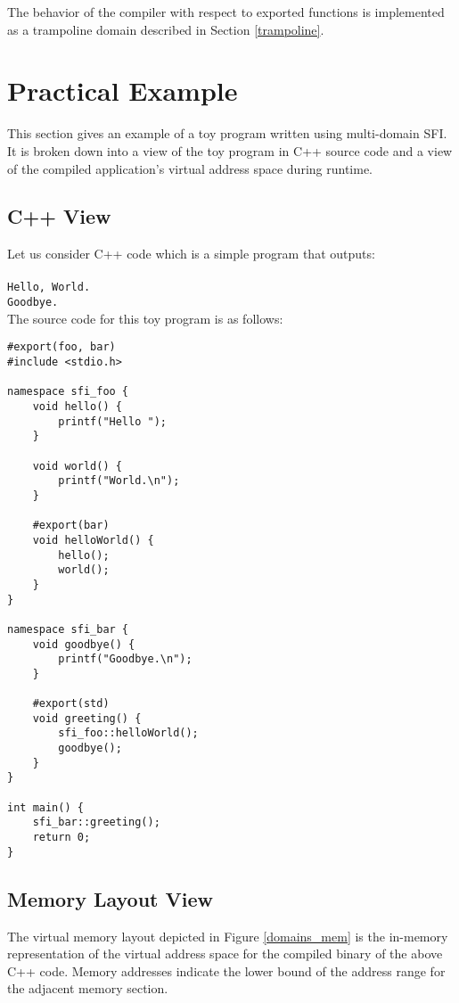 \documentclass[12pt]{IEEEtran}
\begin{document}
The behavior of the compiler with respect to exported functions is implemented as a trampoline domain described in Section \ref{trampoline}.

\section{Practical Example}

This section gives an example of a toy program written using multi-domain SFI. It is broken down into a view of the toy program in C++ source code and a view of the compiled application's virtual address space during runtime.
\subsection{C++ View}

Let us consider C++ code which is a simple program that outputs:\\ \\
\texttt{Hello, World.\\Goodbye.}\\

\noindent The source code for this toy program is as follows:

\begin{verbatim}
#export(foo, bar)
#include <stdio.h>

namespace sfi_foo {
    void hello() {
        printf("Hello ");
    }
	
    void world() {
        printf("World.\n");
    }
	
    #export(bar)
    void helloWorld() {
        hello();
        world();
    }
}

namespace sfi_bar {
    void goodbye() {
        printf("Goodbye.\n");
    }
	
    #export(std)
    void greeting() {
        sfi_foo::helloWorld();
        goodbye();
    }
}

int main() {
    sfi_bar::greeting();
    return 0;
}

\end{verbatim}

\subsection{Memory Layout View}

The virtual memory layout depicted in Figure \ref{domains_mem} is the in-memory representation of the virtual address space for the compiled binary of the above C++ code. Memory addresses indicate the lower bound of the address range for the adjacent memory section.\\
\end{document}
